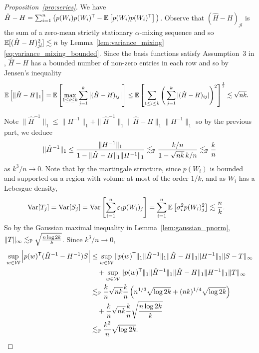 \begin{proof}[Proposition~\ref{pro:series}]

  We have
  $\hat H - H = \sum_{i=1}^n \big(p(W_i)p(W_i)^\T - \E\left[
  p(W_i)p(W_i)^\T \right]\big)$.
  Observe that $(\hat H - H)_{j l}$ is the sum of
  a zero-mean strictly stationary $\alpha$-mixing sequence and so
  $\E[(\hat H - H)_{j l}^2] \lesssim n$ by
  Lemma~\ref{lem:variance_mixing}\ref{eq:variance_mixing_bounded}.
  Since the basis
  functions satisfy Assumption~3 in \citet{cattaneo2020large},
  $\hat H-H$ has a
  bounded number of non-zero entries in each row and so by Jensen's inequality
  \begin{align*}
    \E\left[
      \|\hat H-H\|_1
    \right]
    &=
    \E\left[
      \max_{1 \leq i \leq k}
      \sum_{j=1}^k
      \big|(\hat H-H)_{i j}\big|
    \right]
    \leq
    \E\left[
      \sum_{1 \leq i \leq k}
      \Bigg(
        \sum_{j=1}^k
        |(\hat H-H)_{i j}|
      \Bigg)^2
    \right]^{\frac{1}{2}}
    \lesssim \sqrt{n k}.
  \end{align*}


  Note $\|\hat H^{-1}\|_1 \leq \|H^{-1}\|_1
  + \|\hat H^{-1}\|_1 \|\hat H-H\|_1 \|H^{-1}\|_1$
  so by the previous part, we deduce
  \begin{align*}
    \|\hat H^{-1}\|_1
    \leq
    \frac{\|H^{-1}\|_1}
    {1 - \|\hat H-H\|_1 \|H^{-1}\|_1}
    \lesssim_\P
    \frac{k/n}
    {1 - \sqrt{n k}\, k/n}
    \lesssim_\P
    \frac{k}{n}
  \end{align*}
  as $k^3 / n \to 0$. Note that by the martingale structure, since
  $p(W_i)$ is bounded and supported on a region with volume at most of the order
  $1/k$, and as $W_i$ has a Lebesgue density,
  \begin{align*}
    \Var[T_j]
    &=
    \Var[S_j]
    =
    \Var\left[
      \sum_{i=1}^n \varepsilon_i p(W_i)_j
    \right]
    =
    \sum_{i=1}^n
    \E\left[
      \sigma_i^2 p(W_i)_j^2
    \right]
    \lesssim
    \frac{n}{k}.
  \end{align*}
  So by the Gaussian maximal inequality in Lemma~\ref{lem:gaussian_pnorm},
  $\|T\|_\infty \lesssim_\P \sqrt{\frac{n \log 2k}{k}}$.
  Since $k^3/n \to 0$,
  \begin{align*}
    \sup_{w \in \cW}
    \left|
    p(w)^\T (\hat H^{-1} - H^{-1}) S
    \right|
    &\leq
    \sup_{w \in \cW}
    \|p(w)^\T\|_1
    \|\hat H^{-1}\|_1
    \|\hat H - H\|_1
    \|H^{-1}\|_1
    \|S - T\|_\infty \\
    &\quad+
    \sup_{w \in \cW}
    \|p(w)^\T\|_1
    \|\hat H^{-1}\|_1
    \|\hat H - H\|_1
    \|H^{-1}\|_1
    \|T\|_\infty \\
    &\lesssim_\P
    \frac{k}{n}
    \sqrt{n k}
    \frac{k}{n}
    \left(
      n^{1/3} \sqrt{\log 2k}
      + (n k)^{1/4} \sqrt{\log 2k}
    \right) \\
    &\quad+
    \frac{k}{n}
    \sqrt{n k}
    \frac{k}{n}
    \sqrt{\frac{n \log 2k}{k}} \\
    &\lesssim_\P
    \frac{k^2}{n}
    \sqrt{\log 2k}.
  \end{align*}


\end{proof}
